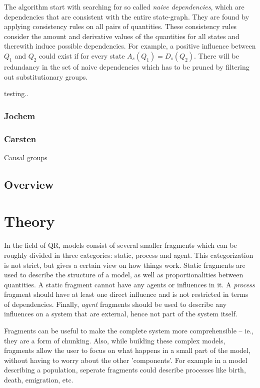 \documentclass{article}
\begin{document}
The algorithm start with searching for so called \emph{naive dependencies},
which are dependencies that are consistent with the entire state-graph. They are
found by applying consistency rules on all pairs of quantities. These
consistency rules consider the amount and derivative values of the quantities
for all states and therewith induce possible dependencies. For example, a
 positive influence between $Q_1$ and $Q_2$ could exist if for every state 
 $A_s(Q_1) = D_s(Q_2)$.
There will be redundancy in the set of naive dependencies which has to be pruned
by filtering out substitutionary groups. %

testing.. 

\subsubsection{Jochem}

\subsubsection{Carsten}
Causal groups %

\subsection{Overview}

\section{Theory}

In the field of QR, models %
consist of
several smaller fragments which can be roughly divided in three categories:
static, process and agent. This categorization is not strict, but gives
a certain view on how things work. Static fragments are used to describe the
structure of a model, as well as proportionalities between quantities. A static
fragment cannot have any agents or influences in it. A \emph{process} fragment
should have at least one direct influence and is not restricted in terms of dependencies. %
Finally, \emph{agent} fragments should be used to describe any influences on a
system that are external, hence not part of the system itself.

Fragments can be useful to make the complete system more comprehensible -- ie., they are a form of chunking. 
Also, while building these complex models, fragments allow the user to focus on
what happens in a small part of the model, without having to worry about the
other 'components'. For example in a model describing a population, seperate
fragments could describe processes like birth, death, emigration, etc.
\end{document}
